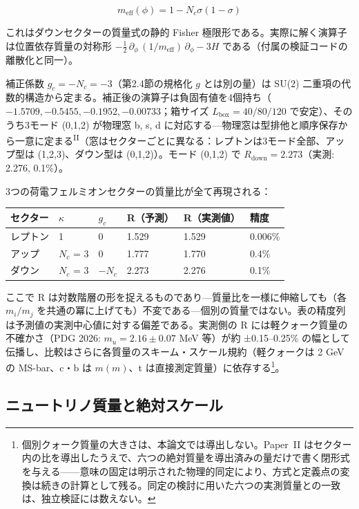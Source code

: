 \documentclass[fontsize=11pt,paper=a4,lualatex]{jlreq}
\newcommand{\PII}{\textsuperscript{\textup{II}}}
\begin{document}
\[m_\mathrm{eff}(\phi) = 1 - N_c \sigma(1{-}\sigma)\]

これはダウンセクターの質量式の静的 Fisher 極限形である。実際に解く演算子は位置依存質量の対称形 $-\tfrac{1}{2}\,\partial_\phi\,(1/m_\mathrm{eff})\,\partial_\phi - 3H$ である（付属の検証コードの離散化と同一）。

補正係数 $g_c = -N_c = -3$（第2.4節の規格化 $g$ とは別の量）は SU(2) 二重項の代数的構造から定まる。補正後の演算子は負固有値を4個持ち（$-1.5709, -0.5455, -0.1952, -0.00733$；箱サイズ $L_\mathrm{box} = 40/80/120$ で安定）、そのうち3モード (0,1,2) が物理窓 b, s, d に対応する---物理窓は型排他と順序保存から一意に定まる\PII{}（窓はセクターごとに異なる：レプトンは3モード全部、アップ型は (1,2,3)、ダウン型は (0,1,2)）。モード (0,1,2) で $R_\mathrm{down} = 2.273$（実測: 2.276, 0.1\%）。

\noindent 3つの荷電フェルミオンセクターの質量比が全て再現される：

\begin{longtable}[]{@{}llllll@{}}
\toprule\noalign{}
セクター & $\kappa$ & $g_c$ & R（予測） & R（実測値） & 精度 \\
\midrule\noalign{}
\endhead
\bottomrule\noalign{}
\endlastfoot
レプトン & 1 & 0 & 1.529 & 1.529 & 0.006\% \\
アップ & $N_c$ = 3 & 0 & 1.777 & 1.770 & 0.4\% \\
ダウン & $N_c$ = 3 & −$N_c$ & 2.273 & 2.276 & 0.1\% \\
\end{longtable}

\noindent ここで R は対数階層の形を捉えるものであり---質量比を一様に伸縮しても（各 $m_i/m_j$ を共通の冪に上げても）不変である---個別の質量ではない。表の精度列は予測値の実測中心値に対する偏差である。実測側の R には軽クォーク質量の不確かさ（PDG 2026: $m_u = 2.16 \pm 0.07$ MeV 等）が約 ±0.15--0.25\% の幅として伝播し、比較はさらに各質量のスキーム・スケール規約（軽クォークは 2 GeV の MS-bar、c・b は $m(m)$、t は直接測定質量）に依存する\footnote{個別クォーク質量の大きさは、本論文では導出しない。Paper~II はセクター内の比を導出したうえで、六つの絶対質量を導出済みの量だけで書く閉形式を与える——意味の固定は明示された物理的同定により、方式と定義点の変換は続きの計算として残る。同定の検討に用いた六つの実測質量との一致は、独立検証には数えない。}。

\subsection{ニュートリノ質量と絶対スケール}
\end{document}
